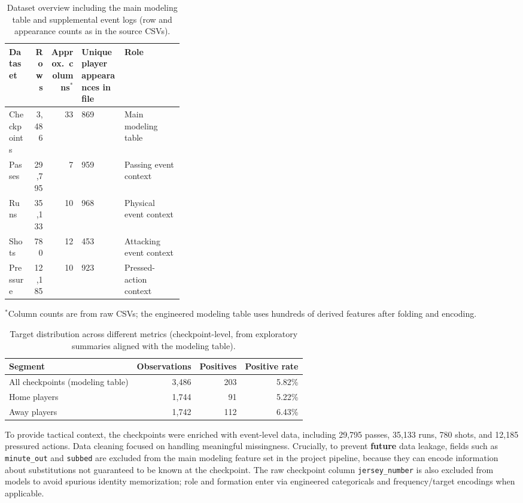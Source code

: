 \documentclass[11pt, a4paper]{article}
\begin{document}
\begin{longtable}{lrrlp{0.34\linewidth}}
\caption{Dataset overview including the main modeling table and supplemental event logs (row and appearance counts as in the source CSVs).}
\label{tab:dataset_overview} \\
\toprule
Dataset & Rows & Approx.\ columns$^*$ & Unique player appearances in file & Role \\
\midrule
Checkpoints & 3,486 & 33 & 869 & Main modeling table \\
Passes & 29,795 & 7 & 959 & Passing event context \\
Runs & 35,133 & 10 & 968 & Physical event context \\
Shots & 780 & 12 & 453 & Attacking event context \\
Pressure & 12,185 & 10 & 923 & Pressed-action context \\
\bottomrule
\end{longtable}
{\footnotesize $^*$Column counts are from raw CSVs; the engineered modeling table uses hundreds of derived features after folding and encoding.}

\begin{longtable}{lrrr}
\caption{Target distribution across different metrics (checkpoint-level, from exploratory summaries aligned with the modeling table).}
\label{tab:target_distribution} \\
\toprule
Segment & Observations & Positives & Positive rate \\
\midrule
All checkpoints (modeling table) & 3,486 & 203 & 5.82\% \\
Home players & 1,744 & 91 & 5.22\% \\
Away players & 1,742 & 112 & 6.43\% \\
\bottomrule
\end{longtable}

To provide tactical context, the checkpoints were enriched with event-level data, including 29,795 passes, 35,133 runs, 780 shots, and 12,185 pressured actions. Data cleaning focused on handling meaningful missingness. Crucially, to prevent \textbf{future} data leakage, fields such as \texttt{minute\_out} and \texttt{subbed} are excluded from the main modeling feature set in the project pipeline, because they can encode information about substitutions not guaranteed to be known at the checkpoint. The raw checkpoint column \texttt{jersey\_number} is also excluded from models to avoid spurious identity memorization; role and formation enter via engineered categoricals and frequency/target encodings when applicable.
\end{document}
